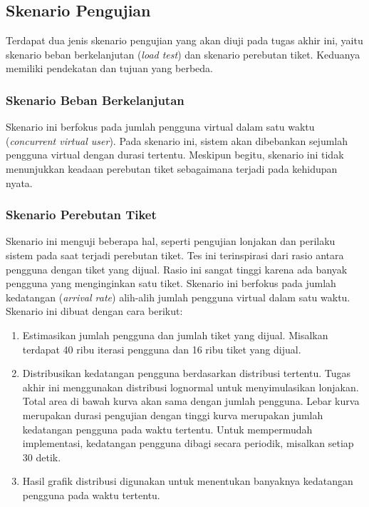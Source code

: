 \subsection{Skenario Pengujian}

Terdapat dua jenis skenario pengujian yang akan diuji pada tugas akhir ini, yaitu skenario beban berkelanjutan (\textit{load test}) dan skenario perebutan tiket. Keduanya memiliki pendekatan dan tujuan yang berbeda.

\subsubsection{Skenario Beban Berkelanjutan}

Skenario ini berfokus pada jumlah pengguna virtual dalam satu waktu (\textit{concurrent virtual user}). Pada skenario ini, sistem akan dibebankan sejumlah pengguna virtual dengan durasi tertentu. Meskipun begitu, skenario ini tidak menunjukkan keadaan perebutan tiket sebagaimana terjadi pada kehidupan nyata.

\subsubsection{Skenario Perebutan Tiket}

Skenario ini menguji beberapa hal, seperti pengujian lonjakan dan perilaku sistem pada saat terjadi perebutan tiket. Tes ini terinspirasi dari rasio antara pengguna dengan tiket yang dijual. Rasio ini sangat tinggi karena ada banyak pengguna yang menginginkan satu tiket. Skenario ini berfokus pada jumlah kedatangan (\textit{arrival rate}) alih-alih jumlah pengguna virtual dalam satu waktu. Skenario ini dibuat dengan cara berikut:

\begin{enumerate}
    \item Estimasikan jumlah pengguna dan jumlah tiket yang dijual. Misalkan terdapat 40 ribu iterasi pengguna dan 16 ribu tiket yang dijual.
    \item Distribusikan kedatangan pengguna berdasarkan distribusi tertentu. Tugas akhir ini menggunakan distribusi lognormal untuk menyimulasikan lonjakan. Total area di bawah kurva akan sama dengan jumlah pengguna. Lebar kurva merupakan durasi pengujian dengan tinggi kurva merupakan jumlah kedatangan pengguna pada waktu tertentu. Untuk mempermudah implementasi, kedatangan pengguna dibagi secara periodik, misalkan setiap 30 detik.
    \item Hasil grafik distribusi digunakan untuk menentukan banyaknya kedatangan pengguna pada waktu tertentu.
\end{enumerate}
